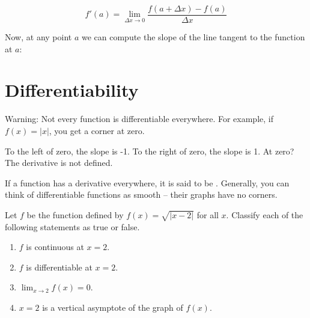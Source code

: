 $$f'(a) = \lim_{\Delta x \rightarrow 0}\frac{f(a + \Delta x) - f(a)}{\Delta x}$$

Now, at any point $a$ we can compute the slope of the line tangent to 
the function at $a$:


\section{Differentiability}

Warning: Not every function is differentiable everywhere.  For
example, if $f(x) = |x|$, you get a corner at zero.


To the left of zero, the slope is -1. To the right of zero, the slope
is 1.  At zero?  The derivative is not defined.

If a function has a derivative everywhere, it is said to be
. Generally, you can think of differentiable
functions as smooth -- their graphs have no corners.

\begin{Exercise} Let $f$ 
	be the function defined by $f(x) = \sqrt{|x - 2|}$ for all $x$. 
	Classify each of the following statements as true or false. 
	\begin{enumerate}
		\item $f$ is continuous at $x = 2$. 
		\item $f$ is differentiable at $x = 2$.
		\item $\lim_{x \to 2} f(x) = 0$.
		\item $x = 2$ is a vertical asymptote of the graph of $f(x)$. 
	\end{enumerate}
\end{Exercise}

